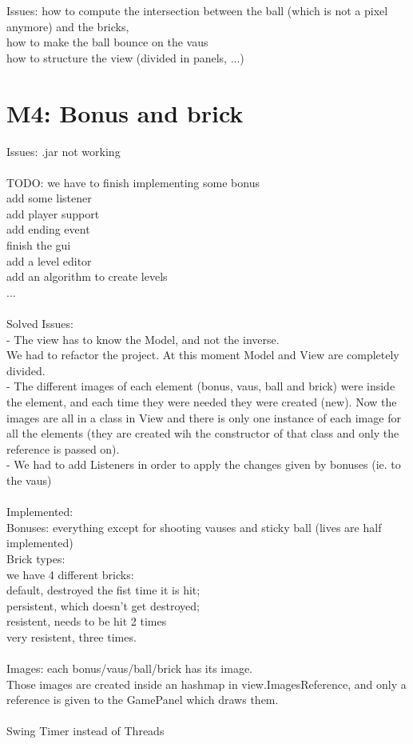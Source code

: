 Issues: how to compute the intersection between the ball (which is not a pixel anymore) and the bricks, \\
		how to make the ball bounce on the vaus\\
		how to structure the view (divided in panels, ...)\\

\section*{M4: Bonus and brick}
\label{sec:m4}

Issues: .jar not working\\
\\
TODO:	we have to finish implementing some bonus\\
		add some listener\\
		add player support\\
		add ending event\\
		finish the gui\\
		add a level editor\\
		add an algorithm to create levels\\
		...\\
\\
Solved Issues:\\
- The view has to know the Model, and not the inverse. \\
  We had to refactor the project. At this moment Model and View are completely divided.\\
- The different images of each element (bonus, vaus, ball and brick) were inside the element, and each time they were needed they were created (new). Now the images are all in a class in View and there is only one instance of each image for all the elements (they are created wih the constructor of that class and only the reference is passed on).\\
- We had to add Listeners in order to apply the changes given by bonuses (ie. to the vaus)\\
\\
Implemented:\\
Bonuses: everything except for shooting vauses and sticky ball (lives are half implemented)\\

Brick types: \\
we have 4 different bricks: \\
default, destroyed the fist time it is hit;\\
persistent, which doesn't get destroyed;\\
resistent, needs to be hit 2 times\\
very resistent, three times.\\
\\
Images: each bonus/vaus/ball/brick has its image. \\
		Those images are created inside an hashmap in view.ImagesReference, and only a reference is given to the GamePanel which draws them.\\
\\
Swing Timer instead of Threads\\

